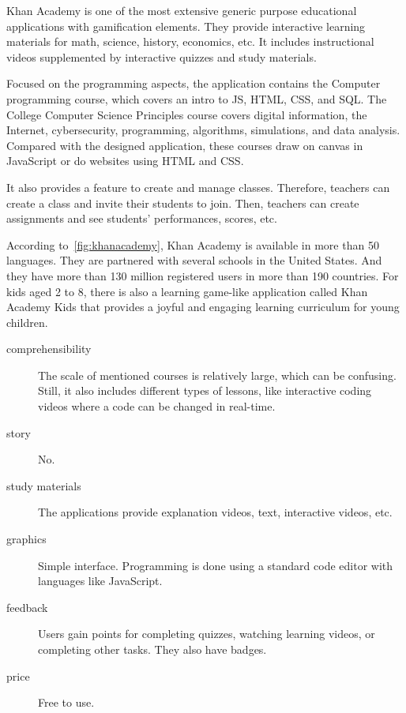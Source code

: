 Khan Academy is one of the most extensive generic purpose educational applications with gamification elements.
They provide interactive learning materials for math, science, history, economics, etc.
It includes instructional videos supplemented by interactive quizzes and study materials.

Focused on the programming aspects,
the application contains the Computer programming course, which covers an intro to JS, HTML, CSS, and SQL. The College Computer Science Principles course covers digital information, the Internet, cybersecurity, programming, algorithms, simulations, and data analysis.
Compared with the designed application, these courses draw on canvas in JavaScript or do websites using HTML and CSS.

It also provides a feature to create and manage classes.
Therefore, teachers can create a class and invite their students to join.
Then, teachers can create assignments and see students' performances, scores, etc.

According to~\ref{fig:khanacademy}, Khan Academy is available in more than 50 languages.
They are partnered with several schools in the United States.
And they have more than 130 million registered users in more than 190 countries.
For kids aged 2 to 8, there is also a learning game-like application called Khan Academy Kids that provides a joyful and engaging learning curriculum for young children.

\pagebreak
\begin{description}
    \item[comprehensibility] The scale of mentioned courses is relatively large, which can be confusing. Still, it also includes different types of lessons, like interactive coding videos where a code can be changed in real-time.
    \item[story] No.    
    \item[study materials] The applications provide explanation videos, text, interactive videos, etc.
    \item[graphics] Simple interface. Programming is done using a standard code editor with languages like JavaScript.
    \item[feedback] Users gain points for completing quizzes, watching learning videos, or completing other tasks. They also have badges. 
    \item[price] Free to use.
\end{description}

